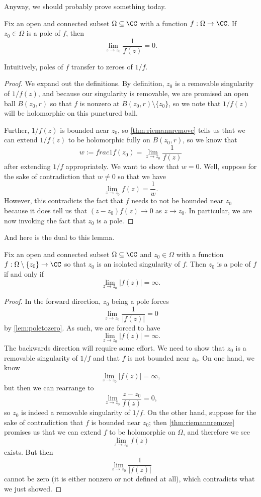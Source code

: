 Anyway, we should probably prove something today.
\begin{lemma} \label{lem:poletozero}
	Fix an open and connected subset $\Omega\subseteq\CC$ with a function $f:\Omega\to\CC$. If $z_0\in\Omega$ is a pole of $f$, then
	\[\lim_{z\to z_0}\frac1{f(z)}=0.\]
\end{lemma}
Intuitively, poles of $f$ transfer to zeroes of $1/f$.
\begin{proof}
	We expand out the definitions. By definition, $z_0$ is a removable singularity of $1/f(z)$, and because our singularity is removable, we are promised an open ball $B(z_0,r)$ so that $f$ is nonzero at $B(z_0,r)\setminus\{z_0\}$, so we note that $1/f(z)$ will be holomorphic on this punctured ball.
	
	Further, $1/f(z)$ is bounded near $z_0$, so \autoref{thm:riemannremove} tells us that we can extend $1/f(z)$ to be holomorphic fully on $B(z_0,r)$, so we know that
	\[w:=frac1{f(z_0)}=\lim_{z\to z_0}\frac1{f(z)}\]
	after extending $1/f$ appropriately. We want to show that $w=0$. Well, suppose for the sake of contradiction that $w\ne0$ so that we have
	\[\lim_{z\to z_0}f(z)=\frac1w.\]
	However, this contradicts the fact that $f$ needs to not be bounded near $z_0$ because it does tell us that $(z-z_0)f(z)\to0$ as $z\to z_0$. In particular, we are now invoking the fact that $z_0$ is a pole.
\end{proof}
And here is the dual to this lemma.
\begin{lemma}
	Fix an open and connected subset $\Omega\subseteq\CC$ and $z_0\in\Omega$ with a function $f:\Omega\setminus\{z_0\}\to\CC$ so that $z_0$ is an isolated singularity of $f$. Then $z_0$ is a pole of $f$ if and only if
	\[\lim_{z\to z_0}|f(z)|=\infty.\]
\end{lemma}
\begin{proof}
	In the forward direction, $z_0$ being a pole forces
	\[\lim_{z\to z_0}\frac1{|f(z)|}=0\]
	by \autoref{lem:poletozero}. As such, we are forced to have
	\[\lim_{z\to z_0}|f(z)|=\infty.\]
	The backwards direction will require some effort. We need to show that $z_0$ is a removable singularity of $1/f$ and that $f$ is not bounded near $z_0$. On one hand, we know
	\[\lim_{z\to z_0}|f(z)|=\infty,\]
	but then we can rearrange to
	\[\lim_{z\to z_0}\frac{z-z_0}{f(z)}=0,\]
	so $z_0$ is indeed a removable singularity of $1/f$. On the other hand, suppose for the sake of contradiction that $f$ is bounded near $z_0$; then \autoref{thm:riemannremove} promises us that we can extend $f$ to be holomorphic on $\Omega$, and therefore we see
	\[\lim_{z\to z_0}f(z)\]
	exists. But then
	\[\lim_{z\to z_0}\frac1{|f(z)|}\]
	cannot be zero (it is either nonzero or not defined at all), which contradicts what we just showed.
\end{proof}

